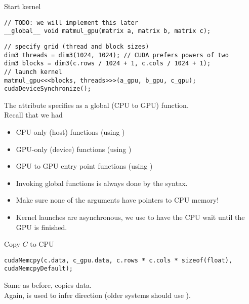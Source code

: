 \begin{frame}[fragile]{Start kernel}
    \begin{verbatim}
// TODO: we will implement this later
__global__ void matmul_gpu(matrix a, matrix b, matrix c);
    \end{verbatim}
    \begin{verbatim}
// specify grid (thread and block sizes)
dim3 threads = dim3(1024, 1024); // CUDA prefers powers of two
dim3 blocks = dim3(c.rows / 1024 + 1, c.cols / 1024 + 1);
// launch kernel
matmul_gpu<<<blocks, threads>>>(a_gpu, b_gpu, c_gpu);
cudaDeviceSynchronize();
    \end{verbatim}

     {
        The  attribute specifies  as a global (CPU to GPU) function. \\
        Recall that we had
        \begin{itemize}
            \item CPU-only (host) functions (using )
            \item GPU-only (device) functions (using )
            \item GPU to GPU entry point functions (using )
        \end{itemize}
    }
     {
        \begin{itemize}
            \item Invoking global functions is always done by the  syntax.
            \item Make sure none of the arguments have pointers to CPU memory!
            \item Kernel launches are asynchronous, we use  to have the CPU wait until the GPU is finished.
        \end{itemize}
    }
\end{frame}

\begin{frame}[fragile]{Copy $C$ to CPU}
    \begin{verbatim}
cudaMemcpy(c.data, c_gpu.data, c.rows * c.cols * sizeof(float), cudaMemcpyDefault);
    \end{verbatim}

    Same as before,  copies data. \\
    Again,  is used to infer direction (older systems should use ).
\end{frame}

